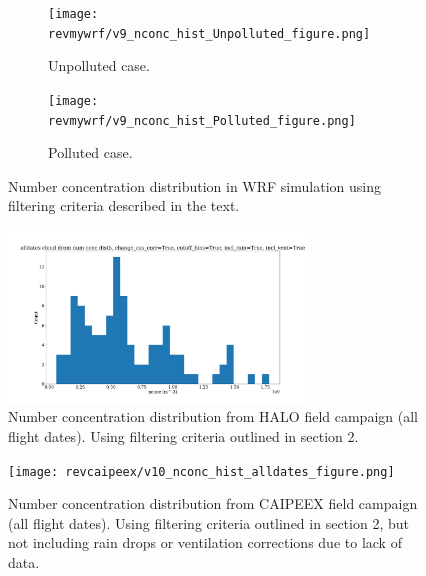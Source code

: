 \documentclass{article}
\begin{document}
\begin{figure}[ht]
	\centering
	\begin{subfigure}{0.7\textwidth}
		\texttt{[image: revmywrf/v9\_nconc\_hist\_Unpolluted\_figure.png]}
		\caption{Unpolluted case.}
		\label{wrfnconchistunpoll}
	\end{subfigure}
	\begin{subfigure}{0.7\textwidth}
		\texttt{[image: revmywrf/v9\_nconc\_hist\_Polluted\_figure.png]}
		\caption{Polluted case.}
		\label{wrfnconchistpoll}
	\end{subfigure}
	\caption{Number concentration distribution in WRF simulation using filtering criteria described in the text.}
	\label{wrfnconchist}
\end{figure}
\begin{figure}[ht]
    \centering
    \includegraphics[width=8cm]{revhalo/v24_nconc_hist_cas_alldates_figure.png}
    \caption{Number concentration distribution from HALO field campaign (all flight dates). Using filtering criteria outlined in section 2.}
    \label{haloqsshist}
\end{figure}
\begin{figure}[ht]
    \centering
    \texttt{[image: revcaipeex/v10\_nconc\_hist\_alldates\_figure.png]}
    \caption{Number concentration distribution from CAIPEEX field campaign (all flight dates). Using filtering criteria outlined in section 2, but not including rain drops or ventilation corrections due to lack of data.}
    \label{caipeexqsshist}
\end{figure}
\end{document}
